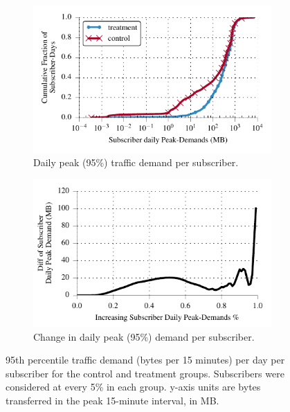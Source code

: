 \begin{figure}[t]
\begin{minipage}{\linewidth}
\centering
\begin{subfigure}[b]{.49\linewidth}
 \includegraphics[width=\linewidth]{figures/cdf_peak_demand-daily.pdf}
                \caption{Daily peak (95\%) traffic demand per subscriber.\label{fig:CDF-data-rate-daily-perc95}}
 \end{subfigure}
\begin{subfigure}[b]{.49\linewidth}
\includegraphics[width=\linewidth]{figures/diff_perc95_bytes_subsc-daily-overall_01.pdf}		%
                \caption{Change in daily peak (95\%) demand per subscriber.\label{fig:diff-peak-daily}} 
\end{subfigure}
%
\end{minipage}
  \caption{95th percentile traffic demand (bytes per 15 minutes) per day
  per subscriber for the control and treatment groups. Subscribers were considered at every 5\% in each group. y-axis units are bytes transferred in the peak 15-minute interval, in MB.\label{fig:traffic-demand-daily}}
\end{figure}


